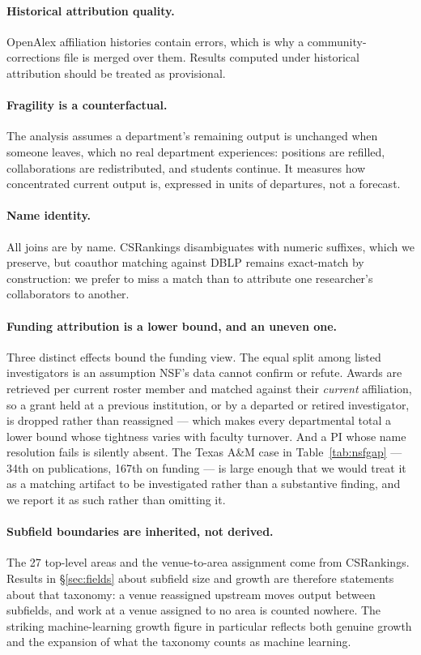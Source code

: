 \documentclass[11pt]{article}
\newcommand{\csr}{CSRankings}
\begin{document}
\paragraph{Historical attribution quality.} OpenAlex affiliation histories
contain errors, which is why a community-corrections file is merged over them.
Results computed under historical attribution should be treated as
provisional.

\paragraph{Fragility is a counterfactual.} The analysis assumes a department's
remaining output is unchanged when someone leaves, which no real department
experiences: positions are refilled, collaborations are redistributed, and
students continue. It measures how concentrated current output is, expressed in
units of departures, not a forecast.

\paragraph{Name identity.} All joins are by name. \csr{} disambiguates with
numeric suffixes, which we preserve, but coauthor matching against DBLP remains
exact-match by construction: we prefer to miss a match than to attribute one
researcher's collaborators to another.

\paragraph{Funding attribution is a lower bound, and an uneven one.} Three
distinct effects bound the funding view. The equal split among listed
investigators is an assumption NSF's data cannot confirm or refute. Awards are
retrieved per current roster member and matched against their \emph{current}
affiliation, so a grant held at a previous institution, or by a departed or
retired investigator, is dropped rather than reassigned --- which makes every
departmental total a lower bound whose tightness varies with faculty turnover.
And a PI whose name resolution fails is silently absent. The Texas A\&M case in
Table~\ref{tab:nsfgap} --- 34th on publications, 167th on funding --- is large
enough that we would treat it as a matching artifact to be investigated rather
than a substantive finding, and we report it as such rather than omitting it.

\paragraph{Subfield boundaries are inherited, not derived.} The 27 top-level
areas and the venue-to-area assignment come from \csr{}. Results in
\S\ref{sec:fields} about subfield size and growth are therefore statements
about that taxonomy: a venue reassigned upstream moves output between
subfields, and work at a venue assigned to no area is counted nowhere. The
striking machine-learning growth figure in particular reflects both genuine
growth and the expansion of what the taxonomy counts as machine learning.
\end{document}
